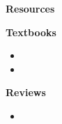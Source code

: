 \begin{frame}\begin{center}
		\LARGE\textbf{Resources}
\end{center}\end{frame}
\begin{frame}[allowframebreaks]\textbf{Textbooks}\vspace{0.3cm}

\begin{itemize}\small
\item {}
\item {}
\end{itemize}

\end{frame}
\begin{frame}[allowframebreaks]\textbf{Reviews}\vspace{0.3cm}

\begin{itemize}\small
\item {}
\end{itemize}

\end{frame}

